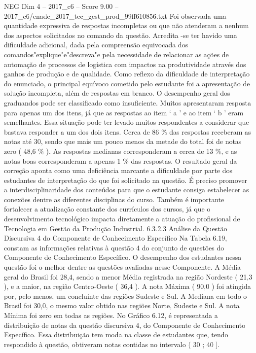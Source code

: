 \begin{textsample}{NEG Dim 4 – 2017\_c6 – Score 9.00 – 2017\_c6/enade\_2017\_tec\_gest\_prod\_99ff610856.txt}
Foi observada uma quantidade expressiva de respostas incompletas ou que não atenderam a nenhum dos aspectos solicitados no comando da questão.
Acredita -se ter havido uma dificuldade adicional, dada pela compreensão equivocada dos comandos"explique"e"descreva"e pela necessidade de relacionar as ações de automação de processos de logística com impactos na produtividade através dos ganhos de produção e de qualidade.
Como reflexo da dificuldade de interpretação do enunciado, o principal equívoco cometido pelo estudante foi a apresentação de solução incompleta, além de respostas em branco.
O desempenho geral dos graduandos pode ser classificado como insuficiente.
Muitos apresentaram resposta para apenas um dos itens, já que as respostas ao item ‘ a ’ e ao item ‘ b ’ eram semelhantes.
Essa situação pode ter levado muitos respondentes a considerar que bastava responder a um dos dois itens.
Cerca de 86 \% das respostas receberam as notas até 30, sendo que mais um pouco menos da metade do total foi de notas zero ( 48,6 \% ).
As respostas medianas corresponderam a cerca de 13 \%, e as notas boas corresponderam a apenas 1 \% das respostas.
O resultado geral da correção aponta como uma deficiência marcante a dificuldade por parte dos estudantes de interpretação do que foi solicitado na questão.
É preciso promover a interdisciplinaridade dos conteúdos para que o estudante consiga estabelecer as conexões dentre as diferentes disciplinas do curso.
Também é importante fortalecer a atualização constante dos currículos dos cursos, já que o desenvolvimento tecnológico impacta diretamente a atuação do profissional de Tecnologia em Gestão da Produção Industrial. 6.3.2.3 Análise da Questão Discursiva 4 do Componente de Conhecimento Específico Na Tabela 6.19, constam as informações relativas à questão 4 do conjunto de questões do Componente de Conhecimento Específico.
O desempenho dos estudantes nessa questão foi o melhor dentre as questões avaliadas nesse Componente.
A Média geral do Brasil foi 28,4, sendo a menor Média registrada na região Nordeste ( 21,3 ), e a maior, na região Centro-Oeste ( 36,4 ).
A nota Máxima ( 90,0 ) foi atingida por, pelo menos, um concluinte das regiões Sudeste e Sul.
A Mediana em todo o Brasil foi 30,0, o mesmo valor obtido nas regiões Norte, Sudeste e Sul.
A nota Mínima foi zero em todas as regiões.
No Gráfico 6.12, é representada a distribuição de notas da questão discursiva 4, do Componente de Conhecimento Específico.
Essa distribuição tem moda na classe de estudantes que, tendo respondido à questão, obtiveram notas contidas no intervalo ( 30 ; 40 ].

\end{textsample}
